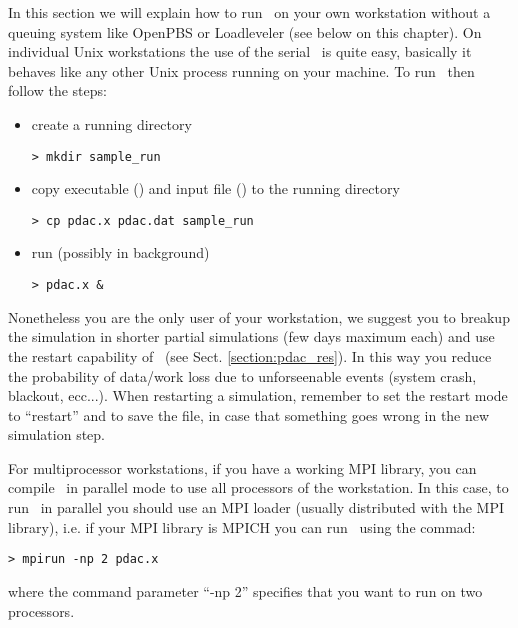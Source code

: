 In this section we will explain how to run \PDAC\ on your own
workstation without a queuing system like
OpenPBS or Loadleveler (see below on this chapter).
On individual Unix workstations the use of the serial \PDAC\ is
quite easy, basically it behaves like any other Unix process
running on your machine.
To run \PDAC\ then follow the steps:

\begin{itemize}

\item create a running directory\
\begin{verbatim}
> mkdir sample_run
\end{verbatim}

\item copy executable () and input file ()
      to the running directory\
\begin{verbatim}
> cp pdac.x pdac.dat sample_run
\end{verbatim}

\item run  (possibly in background)
\begin{verbatim}
> pdac.x &
\end{verbatim}

\end{itemize}

Nonetheless you are the only user of your workstation,
we suggest you to breakup the simulation in shorter partial
simulations (few days maximum each) and use the
restart capability of \PDAC\ (see Sect. \ref{section:pdac_res}). 
In this way you reduce the probability of data/work loss due to 
unforseenable events (system crash, blackout, ecc...).
When restarting a simulation, remember to set the 
restart mode to ``restart'' and to save the  file,
in case that something goes wrong in the new simulation step.

For multiprocessor workstations, if you have a working MPI
library, you can compile \PDAC\ in parallel mode to use
all processors of the workstation. In this case,
to run \PDAC\ in parallel you should use an MPI loader 
(usually distributed with the MPI library), i.e. if
your MPI library is MPICH you can run \PDAC\ using the commad:

\begin{verbatim}
> mpirun -np 2 pdac.x
\end{verbatim}

where the command parameter ``-np 2'' specifies that you want
to run on two processors.

